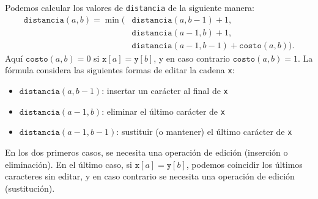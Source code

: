 Podemos calcular los valores de \texttt{distancia}
de la siguiente manera:
\begin{equation*}
    \begin{split}
        \texttt{distancia}(a,b) = \min(& \texttt{distancia}(a,b-1)+1, \\
        & \texttt{distancia}(a-1,b)+1, \\
        & \texttt{distancia}(a-1,b-1)+\texttt{costo}(a,b)).
    \end{split}
\end{equation*}
Aquí $\texttt{costo}(a,b)=0$ si $\texttt{x}[a]=\texttt{y}[b]$,
y en caso contrario $\texttt{costo}(a,b)=1$.
La fórmula considera las siguientes formas de
editar la cadena \texttt{x}:
\begin{itemize}
    \item $\texttt{distancia}(a,b-1)$: insertar un carácter al final de \texttt{x}
    \item $\texttt{distancia}(a-1,b)$: eliminar el último carácter de \texttt{x}
    \item $\texttt{distancia}(a-1,b-1)$: sustituir (o mantener) el último carácter de \texttt{x}
\end{itemize}
En los dos primeros casos, se necesita una operación de edición
(inserción o eliminación).
En el último caso, si $\texttt{x}[a]=\texttt{y}[b]$,
podemos coincidir los últimos caracteres sin editar,
y en caso contrario se necesita una operación de edición (sustitución).

